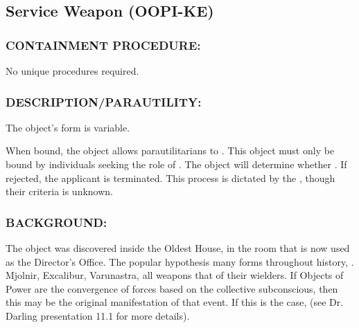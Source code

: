 \subsection*{Service Weapon (OOPI-KE)}
\subsubsection*{CONTAINMENT PROCEDURE:}
\par No unique procedures required.
\subsubsection*{DESCRIPTION/PARAUTILITY:}
\par The object's form is variable.
\par When bound, the object allows
parautilitarians to . This
object must only be bound by individuals
seeking the role of . The object will
determine whether . If
rejected, the applicant is terminated. This process is dictated by
the , though their criteria is unknown.
\subsubsection*{BACKGROUND:}
\par The object was discovered inside the Oldest House, in the room
that is now used as the Director's Office. The popular hypothesis 
many forms throughout history, .
Mjolnir, Excalibur, Varunastra, all weapons that 
of their wielders. If Objects of Power are the convergence of
forces based on the collective subconscious, then this may be
the original manifestation of that event. If this is the case,  (see Dr. Darling presentation 11.1 for more
details).
